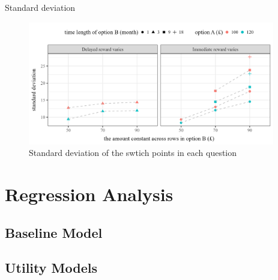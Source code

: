 \documentclass[
  12pt,
]{article}
\begin{document}
Standard deviation

\begin{figure}
  \centering
  \includegraphics[width=0.96\textwidth]{figures/fig_switch_sd.png}
  \caption{Standard deviation of the swtich points in each question}
  \label{fig:choice-sd}
\end{figure}

\hypertarget{regression-analysis}{%
\section{Regression Analysis}\label{regression-analysis}}

\hypertarget{baseline-model}{%
\subsection{Baseline Model}\label{baseline-model}}

\hypertarget{utility-models}{%
\subsection{Utility Models}\label{utility-models}}
\end{document}
